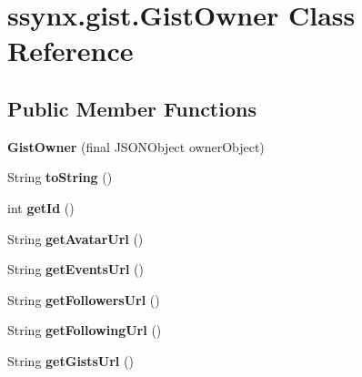 \hypertarget{classssynx_1_1gist_1_1GistOwner}{}\section{ssynx.\+gist.\+Gist\+Owner Class Reference}
\label{classssynx_1_1gist_1_1GistOwner}
\subsection*{Public Member Functions}
\begin{DoxyCompactItemize}
\item 
\mbox{\label{classssynx_1_1gist_1_1GistOwner_ae62817ecf7dc077c3b45fc5abc33cc78}} 
{\bfseries Gist\+Owner} (final J\+S\+O\+N\+Object owner\+Object)
\item 
\mbox{\label{classssynx_1_1gist_1_1GistOwner_ab7e714a5d5007047aee6d3912dbbc03f}} 
String {\bfseries to\+String} ()
\item 
\mbox{\label{classssynx_1_1gist_1_1GistOwner_ac3e0b54672b6e9092b1a0d6b6a70711b}} 
int {\bfseries get\+Id} ()
\item 
\mbox{\label{classssynx_1_1gist_1_1GistOwner_a7d8e160f71eb8b159ca48e2a8301c1bf}} 
String {\bfseries get\+Avatar\+Url} ()
\item 
\mbox{\label{classssynx_1_1gist_1_1GistOwner_a7ab6484b8cd0fc1f55d607d6d25de1df}} 
String {\bfseries get\+Events\+Url} ()
\item 
\mbox{\label{classssynx_1_1gist_1_1GistOwner_a850f65a70fcd601d01fbf8d824773072}} 
String {\bfseries get\+Followers\+Url} ()
\item 
\mbox{\label{classssynx_1_1gist_1_1GistOwner_ad36f3ce46318570576625933ada9c18a}} 
String {\bfseries get\+Following\+Url} ()
\item 
\mbox{\label{classssynx_1_1gist_1_1GistOwner_a0ba9889ee329a10898dde73dc2a6f039}} 
String {\bfseries get\+Gists\+Url} ()

\end{DoxyCompactItemize}
